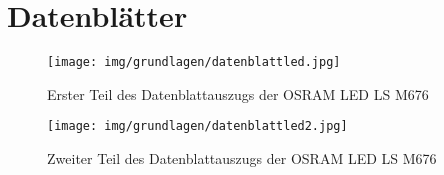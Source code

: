 \section{Datenblätter}
\begin{figure}[H]
	\centering
	\texttt{[image: img/grundlagen/datenblattled.jpg]}
	\caption{Erster Teil des Datenblattauszugs der OSRAM LED LS M676}
	\label{fig:datenblattled1}
\end{figure}
\begin{figure}[htbp]
	\centering
	\texttt{[image: img/grundlagen/datenblattled2.jpg]}
	\caption{Zweiter Teil des Datenblattauszugs der OSRAM LED LS M676}
	\label{fig:datenblattled2}
\end{figure}